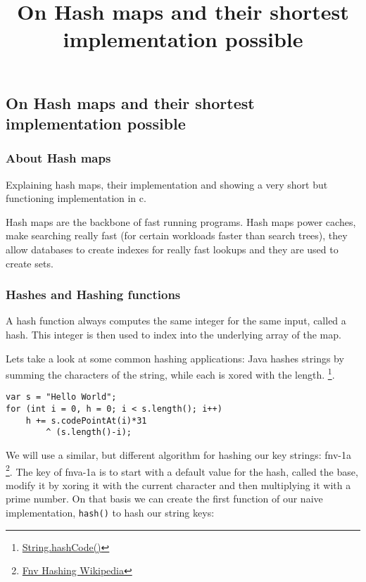 

\title{On Hash maps and their shortest implementation possible}


    \subsection*{On Hash maps and their shortest implementation possible}

    \subsubsection*{About Hash maps}

    Explaining hash maps, their implementation and showing a very short but
    functioning implementation in c.

    Hash maps are the backbone of fast running programs. Hash maps power
    caches, make searching really fast (for certain workloads faster than
    search trees), they allow databases to create indexes for really fast
    lookups and they are used to create sets.

    \subsubsection*{Hashes and Hashing functions}

    A hash function always computes the same integer for the same input, called
    a hash. This integer is then used to index into the underlying array of the
    map.

    Lets take a look at some common hashing applications: Java hashes strings
    by summing the characters of the string, while each is xored with the
    length. 
    \footnote{\href{https://docs.oracle.com/javase/8/docs/api/java/lang/String.html\#hashCode}{String.hashCode()}}.
    \begin{verbatim}
var s = "Hello World";
for (int i = 0, h = 0; i < s.length(); i++)
    h += s.codePointAt(i)*31 
        ^ (s.length()-i);
    \end{verbatim}

    We will use a similar, but different algorithm for hashing our key strings:
    fnv-1a
    \footnote{\href{https://en.wikipedia.org/wiki/Fowler-Noll-Vo_hash_function}{Fnv
    Hashing Wikipedia}}. The key of fnva-1a is to start with a default value
    for the hash, called the base, modify it by xoring it with the current
    character and then multiplying it with a prime number. On that basis we can
    create the first function of our naive implementation, \texttt{hash()} to
    hash our string keys:


